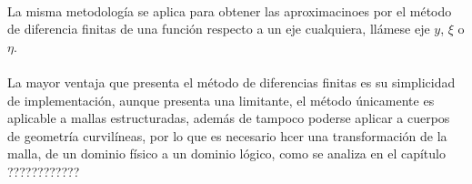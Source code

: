 \documentclass[letterpaper, openright, 12pt]{book}
\begin{document}
	\paragraph*{}
	La misma metodología se aplica para obtener las aproximacinoes por el método de diferencia finitas de una función respecto a un eje cualquiera, llámese eje $y$, $\xi$ o $\eta$.
	
	\paragraph*{}
	La mayor ventaja que presenta el método de diferencias finitas es su simplicidad de implementación, aunque presenta una limitante, el método únicamente es aplicable a mallas estructuradas, además de tampoco poderse aplicar a cuerpos de geometría curvilíneas, por lo que es necesario hcer una transformación de la malla, de un dominio físico a un dominio lógico, como se analiza en el capítulo ????????????
			 
				
			
		 
		
		
		
		
	
	\cleardoublepage
	
	
	
	
	
	
\end{document}
